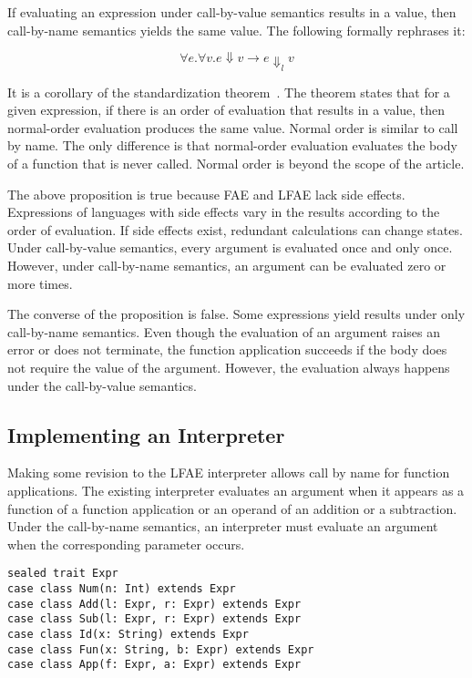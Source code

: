 If evaluating an expression under call-by-value semantics results in a value,
then call-by-name semantics yields the same value. The following formally
rephrases it:

\[
\forall e.\forall v.e\Downarrow v\rightarrow e\Downarrow_l v
\]

It is a corollary of the standardization theorem~\cite{reynoldspl}. The theorem states that for
a given expression, if there is an order of evaluation that results in a value,
then normal-order evaluation produces the same value. Normal order is similar to
call by name. The only difference is that normal-order evaluation evaluates the
body of a function that is never called. Normal order is beyond the scope of the
article.

The above proposition is true because FAE and LFAE lack side effects. Expressions
of languages with side effects vary in the results according to the order of
evaluation. If side effects exist, redundant calculations can change states.
Under call-by-value semantics, every argument is evaluated once and only once.
However, under call-by-name semantics, an argument can be evaluated zero or more
times.

The converse of the proposition is false. Some expressions yield results under
only call-by-name semantics. Even though the evaluation of an argument raises an
error or does not terminate, the function application succeeds if the body does
not require the value of the argument. However, the evaluation always happens
under the call-by-value semantics.

\subsection{Implementing an Interpreter
}

Making some revision to the LFAE interpreter allows call by name for function
applications. The existing interpreter evaluates an argument when it appears as a
function of a function application or an operand of an addition or a subtraction.
Under the call-by-name semantics, an interpreter must evaluate an argument when
the corresponding parameter occurs.

\begin{verbatim}
sealed trait Expr
case class Num(n: Int) extends Expr
case class Add(l: Expr, r: Expr) extends Expr
case class Sub(l: Expr, r: Expr) extends Expr
case class Id(x: String) extends Expr
case class Fun(x: String, b: Expr) extends Expr
case class App(f: Expr, a: Expr) extends Expr
\end{verbatim}

